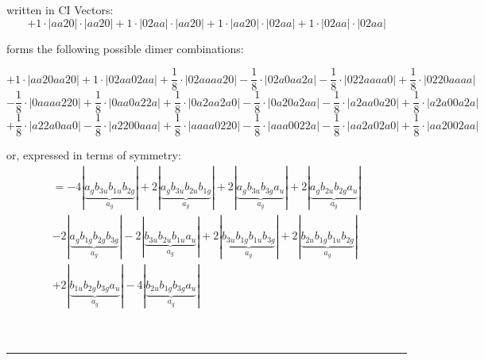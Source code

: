 \documentclass{article}
\begin{document}
\begin{minipage}{\linewidth}
written in CI Vectors: 
 $$+ 1 \cdot \left|aa20 \right| \cdot \left| aa20 \right| 
+ 1 \cdot \left|02aa \right| \cdot \left| aa20 \right| 
+ 1 \cdot \left|aa20 \right| \cdot \left| 02aa \right| 
+ 1 \cdot \left|02aa \right| \cdot \left| 02aa \right| 
$$



 forms the following possible dimer combinations:

$$+ 1 \cdot \left|aa20aa20 \right| + 1 \cdot \left|02aa02aa \right| + \frac{1}{8} \cdot \left|02aaaa20 \right| - \frac{1}{8} \cdot \left|02a0aa2a \right| - \frac{1}{8} \cdot \left|022aaaa0 \right| + \frac{1}{8} \cdot \left|0220aaaa \right|  $$ $$ - \frac{1}{8} \cdot \left|0aaaa220 \right| + \frac{1}{8} \cdot \left|0aa0a22a \right| + \frac{1}{8} \cdot \left|0a2aa2a0 \right| - \frac{1}{8} \cdot \left|0a20a2aa \right| - \frac{1}{8} \cdot \left|a2aa0a20 \right| + \frac{1}{8} \cdot \left|a2a00a2a \right|  $$ $$ + \frac{1}{8} \cdot \left|a22a0aa0 \right| - \frac{1}{8} \cdot \left|a2200aaa \right| + \frac{1}{8} \cdot \left|aaaa0220 \right| - \frac{1}{8} \cdot \left|aaa0022a \right| - \frac{1}{8} \cdot \left|aa2a02a0 \right| + \frac{1}{8} \cdot \left|aa2002aa \right| $$



\end{minipage}
\vspace{0.5cm}


or, expressed in terms of symmetry:\begin{multline*}
=-4\left|\underbrace{a_{g} b_{3u} b_{1u} b_{2g}}_{a_{g}}\right|+2\left|\underbrace{a_{g} b_{3u} b_{2u} b_{1g}}_{a_{g}}\right|+2\left|\underbrace{a_{g} b_{3u} b_{3g} a_{u}}_{a_{g}}\right|+2\left|\underbrace{a_{g} b_{2u} b_{2g} a_{u}}_{a_{g}}\right|\\
-2\left|\underbrace{a_{g} b_{1g} b_{2g} b_{3g}}_{a_{g}}\right|-2\left|\underbrace{b_{3u} b_{2u} b_{1u} a_{u}}_{a_{g}}\right|+2\left|\underbrace{b_{3u} b_{1g} b_{1u} b_{3g}}_{a_{g}}\right|+2\left|\underbrace{b_{2u} b_{1g} b_{1u} b_{2g}}_{a_{g}}\right|\\
+2\left|\underbrace{b_{1u} b_{2g} b_{3g} a_{u}}_{a_{g}}\right|-4\left|\underbrace{b_{2u} b_{1g} b_{3g} a_{u}}_{a_{g}}\right|
\end{multline*}\\\\

 


\hrule
\vspace{0.5cm}
\end{document}
